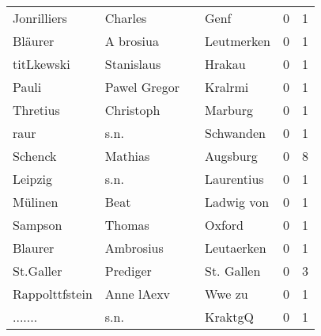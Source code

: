 \begin{center}
\begin{tiny}
\begin{longtabu}{llllrr}
              Jonrilliers &                            Charles &             &                                        Genf &          0 &         1 \\
                  Bläurer &                          A brosiua &             &                                  Leutmerken &          0 &         1 \\
               titLkewski &                         Stanislaus &             &                                      Hrakau &          0 &         1 \\
                    Pauli &                       Pawel Gregor &             &                                     Kralrmi &          0 &         1 \\
                 Thretius &                          Christoph &             &                                     Marburg &          0 &         1 \\
                     raur &                               s.n. &             &                                   Schwanden &          0 &         1 \\
                  Schenck &                            Mathias &             &                                    Augsburg &          0 &         8 \\
                  Leipzig &                               s.n. &             &                                  Laurentius &          0 &         1 \\
                  Mülinen &                               Beat &             &                                  Ladwig von &          0 &         1 \\
                  Sampson &                             Thomas &             &                                      Oxford &          0 &         1 \\
                  Blaurer &                          Ambrosius &             &                                  Leutaerken &          0 &         1 \\
                St.Galler &                           Prediger &             &                                  St. Gallen &          0 &         3 \\
           Rappolttfstein &                         Anne lAexv &             &                                      Wwe zu &          0 &         1 \\
                  ....... &                               s.n. &             &                                     KraktgQ &          0 &         1 \\

\end{longtabu}
\end{tiny}
\end{center}
